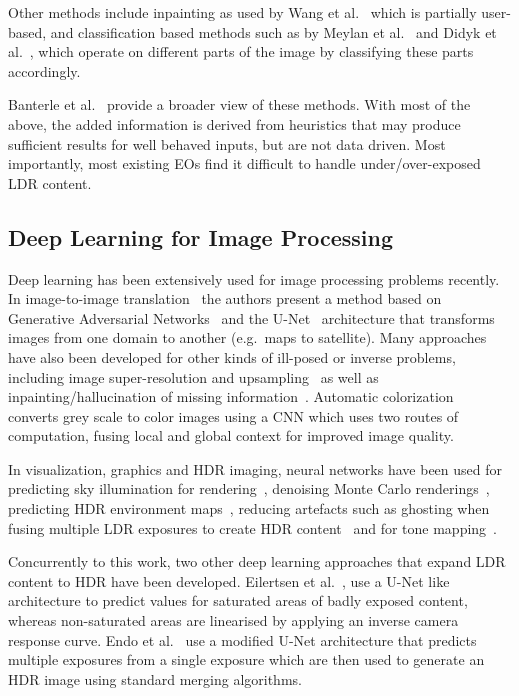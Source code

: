 \documentclass{egpubl}
\newcommand{\tc}[1]{{#1}}
\begin{document}
Other methods include inpainting as used by Wang et al.~\cite{Wang+2007} which is partially user-based, and classification based methods such as by
Meylan et al.~\cite{Meylan+2006} and Didyk et al.~\cite{Didyk+2008}, which operate on different parts of the image by classifying these parts
accordingly.

Banterle et al.~\cite{banterle2009high} provide a broader view of these
methods. With most of the above, the added information is derived from
heuristics that may produce sufficient results for well behaved inputs, but are
not data driven. Most importantly, most existing EOs find it difficult to
handle under/over-exposed LDR content.


\subsection{\textbf{Deep Learning for Image Processing}}

Deep learning has been extensively used for image processing problems recently.
In image-to-image translation~\cite{isola2016pix2pix} the authors present a method based on Generative
Adversarial Networks~\cite{goodfellow2015gan} and the
U-Net~\cite{ronneberger2015unet} architecture that transforms images from one
domain to another (e.g.~maps to satellite). Many approaches have also been
developed for other kinds of ill-posed or inverse problems, including image
super-resolution and
upsampling~\cite{dong2016sr,kim2015drsr,yamanaka2017fastsr} as well as
inpainting/hallucination of missing information~\cite{iizuka2017completion}.
Automatic colorization~\cite{iizuka2016colornet} converts grey scale to color images using a CNN which
uses two routes of computation, fusing local and global context for improved
image quality.

In visualization, graphics and HDR imaging, neural networks have been used for
predicting sky illumination for
rendering~\cite{satilmis2015machine,hold2016illum}, denoising Monte Carlo
renderings~\cite{kalantari2015machine,chaitanya2017interactive,bako2017kernel},
predicting HDR environment maps~\cite{zhang2017learninghdr}, reducing artefacts
such as ghosting when fusing multiple LDR exposures to create HDR
content~\cite{kalantari2017hdr} and for tone mapping~\cite{hou2017tonemap}.

\tc{Concurrently to this work, two other deep learning approaches that expand
LDR content to HDR have been developed. Eilertsen et
al.~\cite{eilertsen2017cnn}, use a U-Net like architecture to predict values for
saturated areas of badly exposed content, whereas non-saturated areas are
linearised by applying an inverse camera response curve. Endo et
al.~\cite{endo2017drtmo} use a modified U-Net architecture that predicts
multiple exposures from a single exposure which are then used to generate an HDR image using
standard merging algorithms.}
\end{document}
